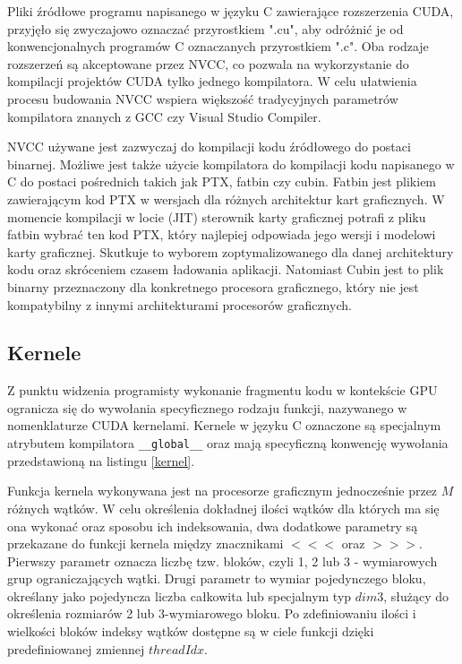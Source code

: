 Pliki źródłowe programu napisanego w języku C zawierające rozszerzenia CUDA, przyjęło się zwyczajowo
oznaczać przyrostkiem ".cu", aby odróżnić je od konwencjonalnych programów C
oznaczanych przyrostkiem ".c". Oba rodzaje rozszerzeń są akceptowane przez NVCC, co
pozwala na wykorzystanie do kompilacji projektów CUDA tylko jednego kompilatora.
W celu ułatwienia procesu budowania NVCC wspiera większość tradycyjnych
parametrów kompilatora znanych z GCC czy Visual Studio Compiler. 

NVCC używane jest zazwyczaj do kompilacji kodu źródłowego do postaci binarnej.
Możliwe jest także użycie kompilatora do kompilacji kodu napisanego w C do
postaci pośrednich takich jak PTX, fatbin czy cubin. Fatbin jest plikiem
zawierającym kod PTX w wersjach dla różnych architektur kart graficznych.  W
momencie kompilacji w locie (JIT) sterownik karty graficznej potrafi z pliku
fatbin wybrać ten kod PTX, który najlepiej odpowiada jego wersji i modelowi
karty graficznej. Skutkuje to wyborem zoptymalizowanego dla danej architektury
kodu oraz skróceniem czasem ładowania aplikacji. Natomiast Cubin jest to plik
binarny przeznaczony dla konkretnego procesora graficznego, który nie jest
kompatybilny z innymi architekturami procesorów graficznych.

\subsection{Kernele}
Z punktu widzenia programisty wykonanie fragmentu kodu w kontekście GPU
ogranicza się do wywołania specyficznego rodzaju funkcji, nazywanego w nomenklaturze CUDA kernelami.
Kernele w języku C oznaczone są specjalnym atrybutem kompilatora
\texttt{\_\_global\_\_} oraz mają
specyficzną konwencję wywołania przedstawioną na listingu \ref{kernel}.

Funkcja kernela wykonywana jest na procesorze graficznym jednocześnie przez $M$
różnych wątków. W celu określenia dokładnej ilości wątków dla których ma się ona
wykonać oraz sposobu ich indeksowania, dwa dodatkowe parametry
są przekazane do funkcji kernela między znacznikami $<<<$ oraz $>>>$. Pierwszy parametr
oznacza liczbę tzw. bloków, czyli 1, 2 lub 3 - wymiarowych grup ograniczających
wątki. Drugi parametr to wymiar pojedynczego bloku, określany jako pojedyncza liczba
całkowita lub specjalnym typ $dim3$, służący do określenia rozmiarów 2 lub
3-wymiarowego bloku. Po zdefiniowaniu ilości i wielkości bloków indeksy wątków dostępne
są w ciele funkcji dzięki predefiniowanej zmiennej $threadIdx$.

